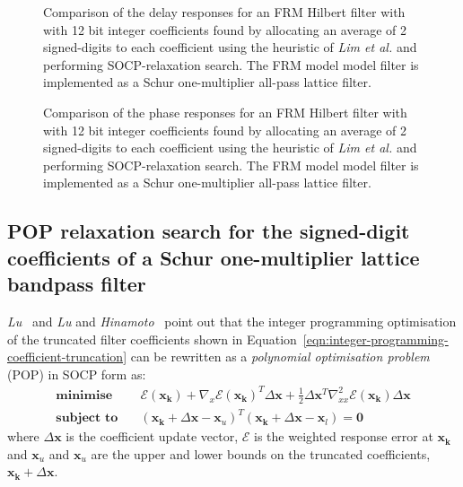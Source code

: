 \documentclass[a4paper,twoside,10pt,english]{report}
\begin{document}
\begin{figure}[!htbp]
\begin{center}
\scalebox{0.7}{}
\caption{Comparison of the delay responses for an FRM Hilbert filter with
  with 12 bit integer coefficients found by allocating an average of 2
  signed-digits to each coefficient using the heuristic of \emph{Lim et al.}
  and performing SOCP-relaxation search. The FRM model model filter is
  implemented as a Schur one-multiplier all-pass lattice filter.}
\label{fig:socp-relax-FRM-hilbert-schurOneMAPlattice-12-nbits-delay-response}
\end{center}
\end{figure}

\begin{figure}[!htbp]
\begin{center}
\scalebox{0.7}{}
\caption{Comparison of the phase responses for an FRM Hilbert filter with
  with 12 bit integer coefficients found by allocating an average of 2
  signed-digits to each coefficient using the heuristic of \emph{Lim et al.}
  and performing SOCP-relaxation search. The FRM model model filter is
  implemented as a Schur one-multiplier all-pass lattice filter.}
\label{fig:socp-relax-FRM-hilbert-schurOneMAPlattice-12-nbits-phase-response}
\end{center}
\end{figure}
\clearpage
\subsection{\label{sec:POP-relaxation-search-signed-digit-coefficients-bandpass}POP relaxation search for the signed-digit coefficients of a Schur one-multiplier lattice bandpass filter}
\emph{Lu}~\cite{Lu_DigitalFilterGlobalPolynomialOptimization} and \emph{Lu} and 
\emph{Hinamoto}~\cite{LuHinamoto_FIRDiscreteCoefficientsPolynomialProgramming} 
point out that the integer programming optimisation of the truncated filter 
coefficients shown in 
Equation~\ref{eqn:integer-programming-coefficient-truncation} can be rewritten 
as a \emph{polynomial optimisation problem} (POP) in SOCP form as:
\begin{align*}
\textbf{minimise}\quad&
\mathcal{E}\left(\boldsymbol{x_{k}}\right)+
\nabla_{x}\mathcal{E}\left(\boldsymbol{x_{k}}\right)^{T}\Delta\boldsymbol{x}+
\frac{1}{2}\Delta\boldsymbol{x}^{T}
\nabla^{2}_{xx}\mathcal{E}\left(\boldsymbol{x_{k}}\right)\Delta\boldsymbol{x} \\
\textbf{subject to}\quad&
\left(\boldsymbol{x_{k}}+\Delta\boldsymbol{x}-\boldsymbol{x}_{u}\right)^{T}
\left(\boldsymbol{x_{k}}+\Delta\boldsymbol{x}-\boldsymbol{x}_{l}\right)
=\boldsymbol{0}
\end{align*}
where $\Delta\boldsymbol{x}$ is the coefficient update vector, $\mathcal{E}$ 
is the weighted response error at $\boldsymbol{x_{k}}$ and $\boldsymbol{x}_{u}$
and $\boldsymbol{x}_{u}$ are the upper and lower bounds on the truncated 
coefficients, $\boldsymbol{x_{k}}+\Delta\boldsymbol{x}$. 
\end{document}
